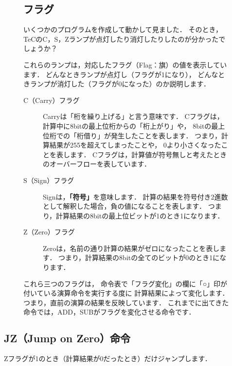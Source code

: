 \begin{figure}[btp]
\begin{framed}
\subsection*{フラグ}
いくつかのプログラムを作成して動かして見ました．
そのとき，
TeCのC，S，Zランプが点灯したり消灯したりしたのが分かったでしょうか？

これらのランプは，対応したフラグ（Flag：旗）の値を表示しています．
どんなときランプが点灯し（フラグが1になり），
どんなときランプが消灯した（フラグが0になった）のか説明します．

\begin{description}
\item[C（Carry）フラグ]
Carryは「桁を繰り上げる」と言う意味です．
Cフラグは，
計算中に8bitの最上位桁からの「桁上がり」や，
8bitの最上位桁での「桁借り」が発生したことを表します．
つまり，計算結果が255を超えてしまったことや，
0より小さくなったことを表します．
Cフラグは，計算値が符号無しと考えたときのオーバーフローを表しています．
\item [S（Sign）フラグ]
Signは，{\bf 「符号」}を意味します．
計算の結果を符号付き2進数として解釈した場合，負の値になることを表します．
つまり，計算結果の8bitの最上位ビットが1のとき1になります．
\item [Z（Zero）フラグ]
Zeroは，名前の通り計算の結果がゼロになったことを表します．
つまり，計算結果の8bitの全てのビットが0のとき1になります．
\end{description}

これら三つのフラグは，
命令表で「フラグ変化」の欄に「○」印が付いている演算命令を実行する度に
計算結果によって変化します．
つまり，直前の演算の結果を反映しています．
これまでに出てきた命令では，ADD，SUBがフラグを変化させる命令です．
\end{framed}
\end{figure}

\newpage
\subsection{JZ（Jump on Zero）命令}
Zフラグが1のとき（計算結果が0だったとき）だけジャンプします．

